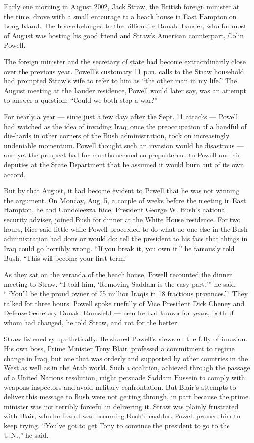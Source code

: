 Early one morning in August 2002, Jack Straw, the British foreign
minister at the time, drove with a small entourage to a beach house in
East Hampton on Long Island. The house belonged to the billionaire
Ronald Lauder, who for most of August was hosting his good friend and
Straw's American counterpart, Colin Powell.

The foreign minister and the secretary of state had become
extraordinarily close over the previous year. Powell's customary 11 p.m.
calls to the Straw household had prompted Straw's wife to refer to him
as ``the other man in my life.'' The August meeting at the Lauder
residence, Powell would later say, was an attempt to answer a question:
``Could we both stop a war?''

For nearly a year --- since just a few days after the Sept. 11 attacks
--- Powell had watched as the idea of invading Iraq, once the
preoccupation of a handful of die-hards in other corners of the Bush
administration, took on increasingly undeniable momentum. Powell thought
such an invasion would be disastrous --- and yet the prospect had for
months seemed so preposterous to Powell and his deputies at the State
Department that he assumed it would burn out of its own accord.

But by that August, it had become evident to Powell that he was not
winning the argument. On Monday, Aug. 5, a couple of weeks before the
meeting in East Hampton, he and Condoleezza Rice, President George W.
Bush's national security adviser, joined Bush for dinner at the White
House residence. For two hours, Rice said little while Powell proceeded
to do what no one else in the Bush administration had done or would do:
tell the president to his face that things in Iraq could go horribly
wrong. ``If you break it, you own it,'' he
\href{https://www.nytimes.com/2004/04/17/world/the-struggle-for-iraq-policy-wary-powell-said-to-have-warned-bush-on-war.html}{famously
told Bush}. ``This will become your first term.''

As they sat on the veranda of the beach house, Powell recounted the
dinner meeting to Straw. ``I told him, `Removing Saddam is the easy
part,''' he said. `` `You'll be the proud owner of 25 million Iraqis in
18 fractious provinces.''' They talked for three hours. Powell spoke
ruefully of Vice President Dick Cheney and Defense Secretary Donald
Rumsfeld --- men he had known for years, both of whom had changed, he
told Straw, and not for the better.

Straw listened sympathetically. He shared Powell's views on the folly of
invasion. His own boss, Prime Minister Tony Blair, professed a
commitment to regime change in Iraq, but one that was orderly and
supported by other countries in the West as well as in the Arab world.
Such a coalition, achieved through the passage of a United Nations
resolution, might persuade Saddam Hussein to comply with weapons
inspectors and avoid military confrontation. But Blair's attempts to
deliver this message to Bush were not getting through, in part because
the prime minister was not terribly forceful in delivering it. Straw was
plainly frustrated with Blair, who he feared was becoming Bush's
enabler. Powell pressed him to keep trying. ``You've got to get Tony to
convince the president to go to the U.N.,'' he said.

